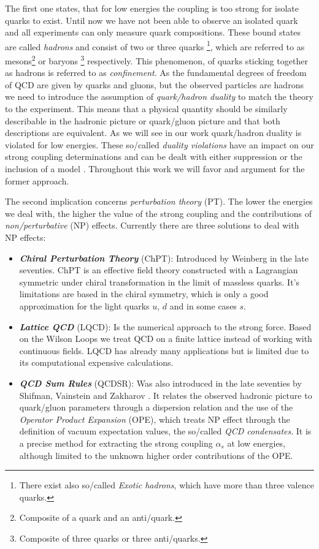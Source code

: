 \documentclass[../../index.tex]{subfiles}
\begin{document}
The first one states, that for low energies the coupling is too strong for
isolate quarks to exist. Until now we have not been able to observe an isolated
quark and all experiments can only measure quark compositions. These bound
states are called \textit{hadrons} and consist of two or three quarks
\footnote{There exist also so\-/called \textit{Exotic hadrons}, which have more
  than three valence quarks.}, which are referred to as mesons\footnote{Composite
  of a quark and an anti\-/quark.} or baryons \footnote{Composite of three quarks
  or three anti\-/quarks.} respectively. This
phenomenon, of quarks sticking together as hadrons is referred to as \textit{confinement}. 
As the fundamental degrees of freedom of QCD are given by quarks and gluons, but
the observed particles are hadrons we need to introduce the assumption of
\textit{quark\-/hadron duality} to match the theory to the experiment. This means that a physical quantity should be
similarly describable in the hadronic picture or quark\-/gluon picture and that
both descriptions are equivalent. As we will see in our work quark\-/hadron
duality is violated for low energies. These so\-/called \textit{duality
  violations} have an impact on our strong coupling determinations and can be
dealt with either suppression or the inclusion of a model
\cite{Pich2006,Cata2008}.
Throughout this work we will favor and argument for the former approach.

The second implication concerns \textit{perturbation theory} (PT). The lower
the energies we deal with, the higher the value of the strong coupling and the
contributions of \textit{non\-/perturbative} (NP) effects. Currently there are
three solutions to deal with NP effects:
\begin{itemize}
  \item \textbf{\textit{Chiral Perturbation Theory}} (ChPT): Introduced by Weinberg
    \cite{Weinberg1978} in the late seventies. ChPT is an effective field theory
    constructed with a Lagrangian symmetric under chiral transformation in the
    limit of massless quarks. It's limitations are based in the chiral symmetry,
    which is only a good approximation for the light quarks $u$, $d$ and in some
    cases $s$.
  \item \textbf{\textit{Lattice QCD}} (LQCD): Is the numerical approach to the strong
    force. Based on the Wilson Loops \cite{Wilson1974} we treat QCD on a finite
    lattice instead of working with continuous fields. LQCD has already many applications but
    is limited due to its computational expensive calculations.
  \item \textbf{\textit{QCD Sum Rules}} (QCDSR): Was also introduced in the late seventies by
    Shifman, Vainstein and Zakharov \cite{Shifman1978,Shifman1978a}. It relates
    the observed hadronic picture to quark\-/gluon parameters through a dispersion
    relation and the use of the \textit{Operator Product Expansion} (OPE), which
    treats NP effect through the definition of vacuum expectation values, the
    so\-/called \textit{QCD condensates}. It is a precise method for extracting
    the strong coupling $\alpha_s$ at low energies, although limited to
    the unknown higher order contributions of the OPE.
\end{itemize}
\end{document}
